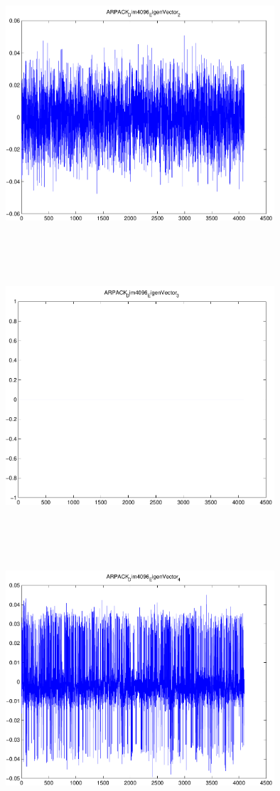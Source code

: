 \documentclass[9pt]{article}
\theoremstyle{plain}
\theoremstyle{definition}
\theoremstyle{remark}
\numberwithin{equation}{section}
\begin{document}
\includegraphics[width=10.0cm,height=10.0cm]{ARPACK_Dim4096_EigenVector_2.pdf}

\includegraphics[width=10.0cm,height=10.0cm]{ARPACK_Dim4096_EigenVector_3.pdf}

\includegraphics[width=10.0cm,height=10.0cm]{ARPACK_Dim4096_EigenVector_4.pdf}
\end{document}
